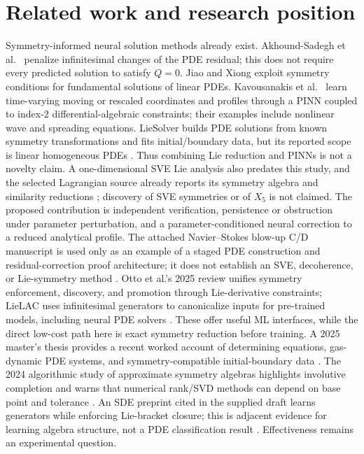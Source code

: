 \documentclass[11pt]{article}
\begin{document}
\section{Related work and research position}
Symmetry-informed neural solution methods already exist. Akhound-Sadegh
et al.\ \cite{sympinn} penalize infinitesimal changes of the PDE residual;
this does not require every predicted solution to satisfy $Q=0$.
Jiao and Xiong \cite{jiao} exploit symmetry conditions for fundamental
solutions of linear PDEs. Kavousanakis et al.\ \cite{flow} learn time-varying
moving or rescaled coordinates and profiles through a PINN coupled to
index-2 differential-algebraic constraints; their examples include nonlinear
wave and spreading equations. LieSolver builds PDE solutions from known
symmetry transformations and fits initial/boundary data, but its reported
scope is linear homogeneous PDEs \cite{liesolver}. Thus combining Lie
reduction and PINNs is not a novelty claim. A one-dimensional SVE Lie analysis
also predates this study, and the selected Lagrangian source already reports
its symmetry algebra and similarity reductions \cite{sveold,ap}; discovery of
SVE symmetries or of $X_5$ is not claimed. The proposed contribution is
independent verification, persistence or obstruction under parameter
perturbation, and a parameter-conditioned neural correction to a reduced
analytical profile. The attached Navier--Stokes blow-up C/D manuscript is
used only as an example of a staged PDE construction and residual-correction
proof architecture; it does not establish an SVE, decoherence, or Lie-symmetry
method \cite{naviercd}. Otto et al.'s 2025 review unifies symmetry enforcement,
discovery, and promotion through Lie-derivative constraints; LieLAC uses
infinitesimal generators to canonicalize inputs for pre-trained models,
including neural PDE solvers \cite{otto,lieLAC}. These offer useful ML
interfaces, while the direct low-cost path here is exact symmetry reduction
before training. A 2025 master's thesis provides a recent worked account of
determining equations, gas-dynamic PDE systems, and symmetry-compatible
initial-boundary data \cite{beligiannis}. The 2024 algorithmic study of
approximate symmetry algebras highlights involutive completion and warns that
numerical rank/SVD methods can depend on base point and tolerance
\cite{approxalg}. An SDE preprint cited in the supplied draft learns generators while enforcing
Lie-bracket closure; this is adjacent evidence for learning algebra structure,
not a PDE classification result \cite{liestonet}. Effectiveness remains an
experimental question.
\end{document}
